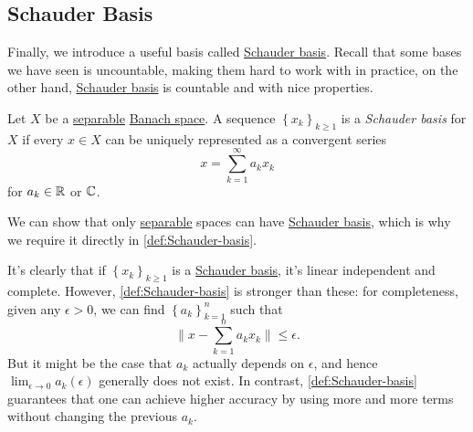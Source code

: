 \subsection{Schauder Basis}
Finally, we introduce a useful basis called \hyperref[def:Schauder-basis]{Schauder basis}. Recall that some bases we have seen is uncountable, making them hard to work with in practice, on the other hand, \hyperref[def:Schauder-basis]{Schauder basis} is countable and with nice properties.

\begin{definition}\label{def:Schauder-basis}
	Let \(X\) be a \hyperref[def:separable]{separable} \hyperref[def:Banach-space]{Banach space}. A sequence \(\left\{ x_k \right\} _{k\geq 1}\) is a \emph{Schauder basis} for \(X\) if every \(x\in X\) can be uniquely represented as a convergent series
	\[
		x = \sum_{k=1} ^{\infty} a_k x_k
	\]
	for \(a_k\in \mathbb{\MakeUppercase{r}} \) or \(\mathbb{\MakeUppercase{c}} \).
\end{definition}

\begin{remark}
	We can show that only \hyperref[def:separable]{separable} spaces can have \hyperref[def:Schauder-basis]{Schauder basis}, which is why we require it directly in \autoref{def:Schauder-basis}.
\end{remark}

It's clearly that if \(\left\{ x_k \right\} _{k\geq 1}\) is a \hyperref[def:Schauder-basis]{Schauder basis}, it's linear independent and complete. However, \autoref{def:Schauder-basis} is stronger than these: for completeness, given any \(\epsilon > 0\), we can find \(\left\{ a_k \right\} _{k=1}^n\) such that
\[
	\lVert x - \sum_{k=1}^n a_{k} x_{k} \rVert \leq \epsilon.
\]
But it might be the case that \(a_k\) actually depends on \(\epsilon \), and hence \(\lim_{\epsilon \to 0}a_k(\epsilon )\) generally does not exist. In contrast, \autoref{def:Schauder-basis} guarantees that one can achieve higher accuracy by using more and more terms without changing the previous \(a_k\).

